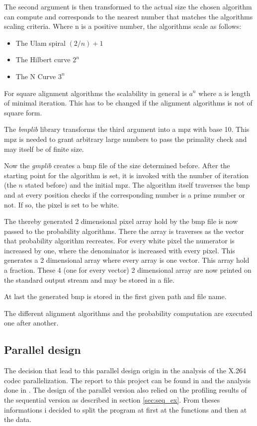 The second argument is then transformed to the actual size the chosen algorithm can compute and corresponds to the nearest number that matches the algorithms scaling criteria. Where n is a positive number, the algorithms scale as follows:
\begin{itemize}
   \item The Ulam spiral
      $(2/n)+1$
   \item The Hilbert curve
      $2^n$
   \item The N Curve
      $3^n$
\end{itemize}
For square alignment algorithms the scalability in general is $a^n$ where a is length of minimal iteration. This has to be changed if the alignment algorithms is not of square form.

The \emph{bmplib} library transforms the third argument into a mpz with base 10. This mpz is needed to grant arbitrary large numbers to pass the primality check and may itself be of finite size.

Now the \emph{gmplib} creates a bmp file of the size determined before. After the starting point for the algorithm is set, it is invoked with the number of iteration (the $n$ stated before) and the initial mpz. The algorithm itself traverses the bmp and at every position checks if the corresponding number is a prime number or not. If so, the pixel is set to be white.

The thereby generated 2 dimensional pixel array hold by the bmp file is now passed to the probability algorithms. There the array is traverses as the vector that probability algorithm recreates. For every white pixel the numerator is increased by one, where the denominator is increased with every pixel. This generates a 2 dimensional array where every array is one vector. This array hold a fraction. These 4 (one for every vector) 2 dimensional array are now printed on the  standard output stream and may be stored in a file.

At last the generated bmp is stored in the first given path and file name.

The different alignment algorithms and the probability computation are executed one after another.

\subsection{Parallel design}
\label{sec:paralleldesign}
The decision that lead to this parallel design origin in the analysis of the X.264 codec parallelization. The report to this project can be found in \cite{BS08} and the analysis done in \cite{self}. The design of the parallel version also relied on the profiling results of the sequential version as described in section \ref{sec:seq_ex}. From theses informations i decided to split the program at first at the functions and then at the data.


